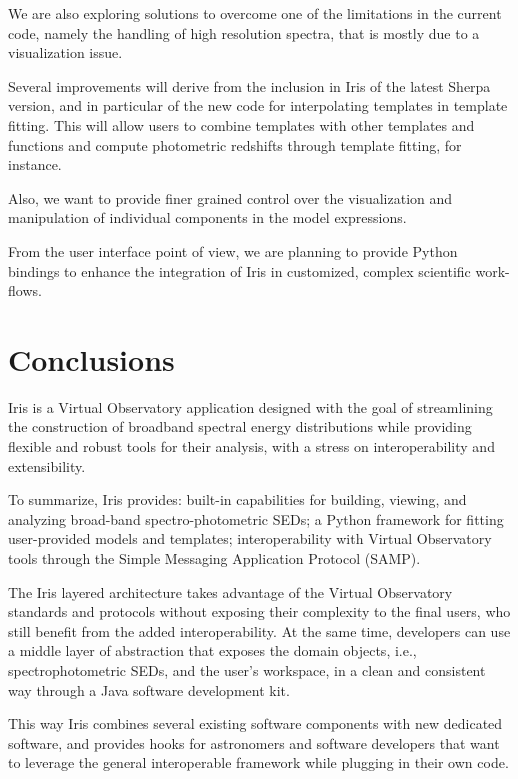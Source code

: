 \documentclass[final,5p,authoryear]{elsarticle}
\begin{document}
We are also exploring solutions to overcome one of the limitations in the
current code, namely the handling of high resolution spectra, that is mostly due
to a visualization issue.

Several improvements will derive from the inclusion in Iris of the latest Sherpa
version, and in particular of the new code for interpolating templates in
template fitting. This will allow users to combine templates with other
templates and functions and compute photometric redshifts through template
fitting, for instance.

Also, we want to provide finer grained control over the visualization and
manipulation of individual components in the model expressions.

From the user interface point of view, we are planning to provide Python
bindings to enhance the integration of Iris in customized, complex scientific
work-flows.

\section{Conclusions} \label{sec:conclusions}

Iris is a Virtual Observatory application designed with the goal of streamlining
the construction of broadband spectral energy distributions while providing
flexible and robust tools for their analysis, with a stress on interoperability
and extensibility.

To summarize, Iris provides: built-in capabilities for building, viewing, and
analyzing broad-band spec\-tro-pho\-to\-met\-ric SEDs; a Python framework for fitting
user-pro\-vid\-ed models and templates; interoperability with Virtual Observatory
tools through the Simple Messaging Application Protocol (SAMP).

The Iris layered architecture takes advantage of the Virtual Observatory
standards and protocols without exposing their complexity to the final users,
who still benefit from the added interoperability. At the same time, developers
can use a middle layer of abstraction that exposes the domain objects, i.e.,
spectrophotometric SEDs, and the user's workspace, in a clean and consistent
way through a Java software development kit.

This way Iris combines several existing software components with new dedicated
software, and provides hooks for astronomers and software developers that want to
leverage the general interoperable framework while plugging in their own code.
\end{document}
